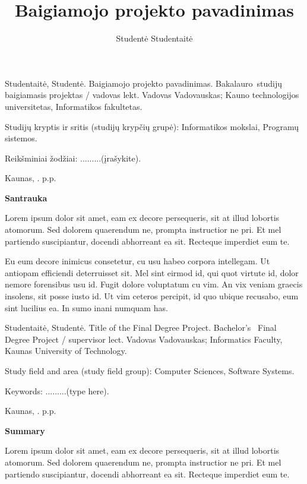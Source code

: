 \documentclass{ktuthesis}
\title{Baigiamojo projekto pavadinimas}
\author{Studentė Studentaitė}
\begin{document}
	\maketitle
	
	\thispagestyle{empty}
	Studentaitė, Studentė. Baigiamojo projekto pavadinimas. Bakalauro studijų baigiamasis projektas / vadovas lekt. Vadovas Vadovauskas; Kauno technologijos universitetas, Informatikos fakultetas.
	
	Studijų kryptis ir sritis (studijų krypčių grupė): Informatikos mokslai, Programų sistemos.
	
	Reikšminiai žodžiai: .........(įrašykite).
	
	Kaunas, \the\year. \pageref{LastPage} p.p.
	
	\begin{center}
		\textbf{Santrauka}
	\end{center}
	
	Lorem ipsum dolor sit amet, eam ex decore persequeris, sit at illud lobortis atomorum. Sed dolorem quaerendum ne, prompta instructior ne pri. Et mel partiendo suscipiantur, docendi abhorreant ea sit. Recteque imperdiet eum te.
	
	Eu eum decore inimicus consetetur, cu usu habeo corpora intellegam. Ut antiopam efficiendi deterruisset sit. Mel sint eirmod id, qui quot virtute id, dolor nemore forensibus usu id. Fugit dolore voluptatum cu vim. An vix veniam graecis insolens, sit posse iusto id. Ut vim ceteros percipit, id quo ubique recusabo, eum sint lucilius ea. In sumo inani numquam has.
	
	\clearpage
	
	\thispagestyle{empty}
	Studentaitė, Studentė. Title of the Final Degree Project. Bachelor's  Final Degree Project / supervisor lect. Vadovas Vadovauskas; Informatics Faculty, Kaunas University of Technology.
	
	Study field and area (study field group): Computer Sciences, Software Systems.
	
	Keywords: .........(type here).
	
	Kaunas, \the\year. \pageref{LastPage} p.p.
	
	\begin{center}
		\textbf{Summary}
	\end{center}
	
	Lorem ipsum dolor sit amet, eam ex decore persequeris, sit at illud lobortis atomorum. Sed dolorem quaerendum ne, prompta instructior ne pri. Et mel partiendo suscipiantur, docendi abhorreant ea sit. Recteque imperdiet eum te.
	
\end{document}
